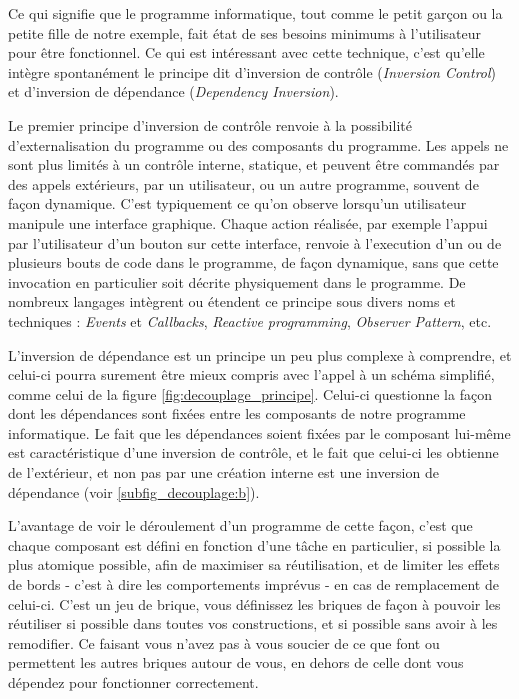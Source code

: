 Ce qui signifie que le programme informatique, tout comme le petit garçon ou la petite fille de notre exemple, fait état de ses besoins minimums à l'utilisateur pour être fonctionnel. Ce qui est intéressant avec cette technique, c'est qu'elle intègre spontanément le principe dit d'inversion de contrôle (\textit{Inversion Control}) et d'inversion de dépendance (\textit{Dependency Inversion}).

Le premier principe d'inversion de contrôle renvoie à la possibilité d'externalisation du programme ou des composants du programme. Les appels ne sont plus limités à un contrôle interne, statique, et peuvent être commandés par des appels extérieurs, par un utilisateur, ou un autre programme, souvent de façon dynamique. C'est typiquement ce qu'on observe lorsqu'un utilisateur manipule une interface graphique. Chaque action réalisée, par exemple l'appui par l'utilisateur d'un bouton sur cette interface, renvoie à l'execution d'un ou de plusieurs bouts de code dans le programme, de façon dynamique, sans que cette invocation en particulier soit décrite physiquement dans le programme. De nombreux langages intègrent ou étendent ce principe sous divers noms et techniques : \textit{Events} et \textit{Callbacks}, \textit{Reactive programming}, \textit{Observer Pattern}, etc.

L'inversion de dépendance est un principe un peu plus complexe à comprendre, et celui-ci pourra surement être mieux compris avec l'appel à un schéma simplifié, comme celui de la figure \ref{fig:decouplage_principe}. Celui-ci questionne la façon dont les dépendances sont fixées entre les composants de notre programme informatique. Le fait que les dépendances soient fixées par le composant lui-même est caractéristique d'une inversion de contrôle, et le fait que celui-ci les obtienne de l'extérieur, et non pas par une création interne est une inversion de dépendance (voir \ref{subfig_decouplage:b}).

L'avantage de voir le déroulement d'un programme de cette façon, c'est que chaque composant est défini en fonction d'une tâche en particulier, si possible la plus atomique possible, afin de maximiser sa réutilisation, et de limiter les effets de bords - c'est à dire les comportements imprévus - en cas de remplacement de celui-ci. C'est un jeu de brique, vous définissez les briques de façon à pouvoir les réutiliser si possible dans toutes vos constructions, et si possible sans avoir à les remodifier. Ce faisant vous n'avez pas à vous soucier de ce que font ou permettent les autres briques autour de vous, en dehors de celle dont vous dépendez pour fonctionner correctement.

